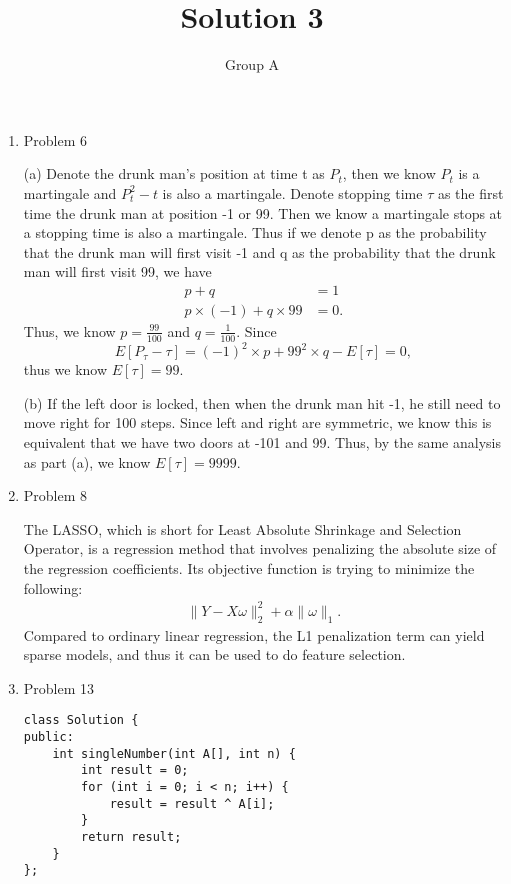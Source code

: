 \documentclass[10pt, onecolumn, draftcls]{IEEEtran}
\begin{document}
\title{Solution 3}
\author{Group A}
\maketitle


\begin{enumerate}
\item Problem 6

(a) Denote the drunk man's position at time t as $P_{t}$, then we know $P_{t}$ is a martingale and $P_{t}^{2}-t$ is also a martingale. Denote stopping time $\tau$ as the first time the drunk man at position -1 or 99. Then we know a martingale stops at a stopping time is also a martingale. Thus if we denote p as the probability that the drunk man will first visit -1 and q as the probability that the drunk man will first visit 99, we have
\begin{align}
p+q&=1\nonumber\\
p\times (-1) + q\times 99 &= 0.\nonumber 
\end{align}
Thus, we know $p=\frac{99}{100}$ and $q=\frac{1}{100}$. Since
\begin{equation}
E[P_{\tau}-\tau] = (-1)^{2}\times p + 99^{2}\times q - E[\tau]=0,\nonumber 
\end{equation}
thus we know $E[\tau]=99$.

(b) If the left door is locked, then when the drunk man hit -1, he still need to move right for 100 steps. Since left and right are symmetric, we know this is equivalent that we have two doors at -101 and 99. Thus, by the same analysis as part (a), we know $E[\tau]=9999$.

\item Problem 8

The LASSO, which is short for Least Absolute Shrinkage and Selection Operator, is a regression method that involves penalizing the absolute size of the regression coefficients. Its objective function is trying to minimize the following:
\begin{align}
\|Y-X\omega\|_{2}^{2} + \alpha\|\omega\|_{1}. \nonumber 
\end{align}
Compared to ordinary linear regression, the L1 penalization term can yield sparse models, and thus it can be used to do feature selection.

\item Problem 13

\begin{lstlisting}
class Solution {
public:
    int singleNumber(int A[], int n) {
        int result = 0;
        for (int i = 0; i < n; i++) {
            result = result ^ A[i];
        }
        return result;
    }
};\end{lstlisting}


\end{enumerate}
\end{document}
